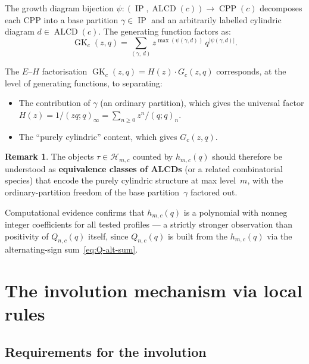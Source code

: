 \documentclass[11pt]{article}
\newcommand{\GK}{\operatorname{GK}}
\newcommand{\CPP}{\operatorname{CPP}}
\newcommand{\ALCD}{\operatorname{ALCD}}
\newcommand{\IP}{\operatorname{IP}}
\newcommand{\qpoch}[2]{(#1;#2)_\infty}
\newcommand{\qpochn}[3]{(#1;#2)_{#3}}
\theoremstyle{plain}
\theoremstyle{definition}
\newtheorem{remark}[theorem]{Remark}
\begin{document}
The growth diagram bijection $\psi\colon (\IP, \ALCD(c)) \to \CPP(c)$
decomposes each CPP into a base partition $\gamma \in \IP$ and an
arbitrarily labelled cylindric diagram $d \in \ALCD(c)$.
The generating function factors as:
\[
  \GK_c(z,q) = \sum_{(\gamma,\, d)} z^{\max(\psi(\gamma,d))}\,
  q^{|\psi(\gamma,d)|}.
\]

The $E$--$H$ factorisation $\GK_c(z,q) = H(z) \cdot G_c(z,q)$
corresponds, at the level of generating functions, to separating:
\begin{itemize}
  \item The contribution of $\gamma$ (an ordinary partition), which
    gives the universal factor
    $H(z) = 1/\qpoch{zq}{q} = \sum_{n \geq 0} z^n/\qpochn{q}{q}{n}$.
  \item The ``purely cylindric'' content, which gives $G_c(z,q)$.
\end{itemize}

\begin{remark}
The objects $\tau \in \mathcal{H}_{m,c}$ counted by $h_{m,c}(q)$ should
therefore be understood as \textbf{equivalence classes of ALCDs}
(or a related combinatorial species) that encode the purely cylindric
structure at max level~$m$, with the ordinary-partition freedom of the
base partition~$\gamma$ factored out.

Computational evidence confirms that $h_{m,c}(q)$ is a polynomial with
nonneg integer coefficients for all tested profiles --- a strictly
stronger observation than positivity of $Q_{n,c}(q)$ itself, since
$Q_{n,c}(q)$ is built from the $h_{m,c}(q)$ via the
alternating-sign sum~\eqref{eq:Q-alt-sum}.
\end{remark}


\section{The involution mechanism via local rules}
\label{sec:involution}

\subsection{Requirements for the involution}
\end{document}
